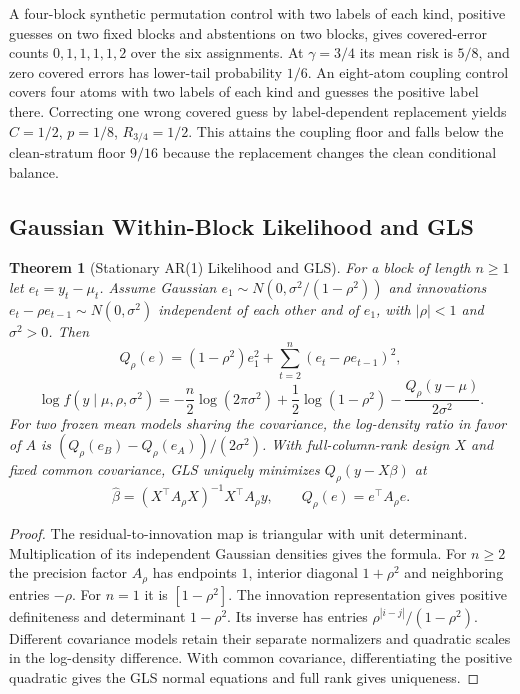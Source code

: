 \documentclass[11pt,a4paper]{article}
\newtheorem{theorem}{Theorem}[section]
\begin{document}
A four-block synthetic permutation control with two labels of each kind, positive guesses on two fixed blocks and abstentions on two blocks, gives covered-error counts $0,1,1,1,1,2$ over the six assignments. At $\gamma=3/4$ its mean risk is $5/8$, and zero covered errors has lower-tail probability $1/6$. An eight-atom coupling control covers four atoms with two labels of each kind and guesses the positive label there. Correcting one wrong covered guess by label-dependent replacement yields $C=1/2$, $p=1/8$, $R_{3/4}=1/2$. This attains the coupling floor and falls below the clean-stratum floor $9/16$ because the replacement changes the clean conditional balance.

\subsection{Gaussian Within-Block Likelihood and GLS}

\begin{theorem}[Stationary AR(1) Likelihood and GLS]\label{thm:stationary-ar1-likelihood-gls}
For a block of length $n\ge1$ let $e_t=y_t-\mu_t$. Assume Gaussian $e_1\sim N(0,\sigma^2/(1-\rho^2))$ and innovations $e_t-\rho e_{t-1}\sim N(0,\sigma^2)$ independent of each other and of $e_1$, with $|\rho|<1$ and $\sigma^2>0$. Then
\[
 Q_\rho(e)=(1-\rho^2)e_1^2+\sum_{t=2}^n(e_t-\rho e_{t-1})^2,
\]
\[
 \log f(y\mid\mu,\rho,\sigma^2)
 =-\frac n2\log(2\pi\sigma^2)+\frac12\log(1-\rho^2)
 -\frac{Q_\rho(y-\mu)}{2\sigma^2}.
\]
For two frozen mean models sharing the covariance, the log-density ratio in favor of $A$ is $(Q_\rho(e_B)-Q_\rho(e_A))/(2\sigma^2)$. With full-column-rank design $X$ and fixed common covariance, GLS uniquely minimizes $Q_\rho(y-X\beta)$ at
\[
 \widehat\beta=(X^\top A_\rho X)^{-1}X^\top A_\rho y,\qquad
 Q_\rho(e)=e^\top A_\rho e .
\]
\end{theorem}
\begin{proof}
The residual-to-innovation map is triangular with unit determinant. Multiplication of its independent Gaussian densities gives the formula. For $n\ge2$ the precision factor $A_\rho$ has endpoints $1$, interior diagonal $1+\rho^2$ and neighboring entries $-\rho$. For $n=1$ it is $[1-\rho^2]$. The innovation representation gives positive definiteness and determinant $1-\rho^2$. Its inverse has entries $\rho^{|i-j|}/(1-\rho^2)$. Different covariance models retain their separate normalizers and quadratic scales in the log-density difference. With common covariance, differentiating the positive quadratic gives the GLS normal equations and full rank gives uniqueness.
\end{proof}
\end{document}
